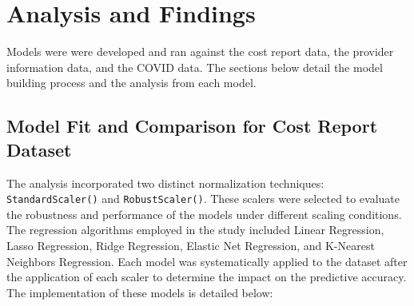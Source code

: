 \documentclass{article}
\theoremstyle{mytheoremstyle}
\theoremstyle{mytheoremstyle}
\theoremstyle{myproblemstyle}
\begin{document}
\pagebreak

\section{Analysis and Findings}

Models were were developed and ran against the cost report data, the provider information data, and the COVID data. The sections below detail the model building process and the analysis from each model.

\subsection{Model Fit and Comparison for Cost Report Dataset}
The analysis incorporated two distinct normalization techniques: \texttt{StandardScaler()} and \texttt{RobustScaler()}. These scalers were selected to evaluate the robustness and performance of the models under different scaling conditions. The regression algorithms employed in the study included Linear Regression, Lasso Regression, Ridge Regression, Elastic Net Regression, and K-Nearest Neighbors Regression. Each model was systematically applied to the dataset after the application of each scaler to determine the impact on the predictive accuracy. The implementation of these models is detailed below:
\end{document}
